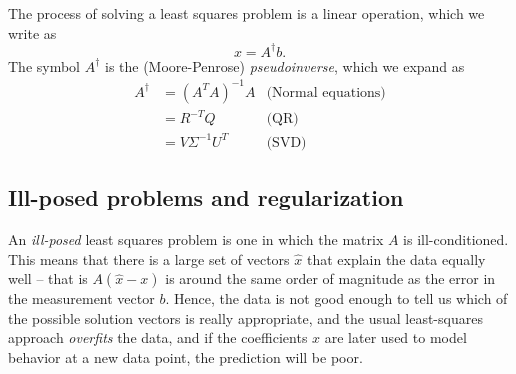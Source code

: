\documentclass[12pt, leqno]{article}
\begin{document}
The process of solving a least squares problem is a linear operation,
which we write as
\[
  x = A^\dagger b.
\]
The symbol $A^\dagger$ is the (Moore-Penrose) {\em pseudoinverse},
which we expand as
\begin{align*}
  A^\dagger
  &= (A^T A)^{-1} A & \mbox{(Normal equations)} \\
  &= R^{-T} Q & \mbox{(QR)} \\
  &= V \Sigma^{-1} U^T & \mbox{(SVD)}
\end{align*}

\subsection{Ill-posed problems and regularization}

An {\em ill-posed} least squares problem is one in which the matrix
$A$ is ill-conditioned.  This means that there is a large set of
vectors $\hat{x}$ that explain the data equally well -- that is
$A(\hat{x}-x)$ is around the same order of magnitude as the
error in the measurement vector $b$.  Hence, the data is not good
enough to tell us which of the possible solution vectors is
really appropriate, and the usual least-squares approach
{\em overfits} the data, and if the coefficients $x$ are later used
to model behavior at a new data point, the prediction will be poor.
\end{document}
